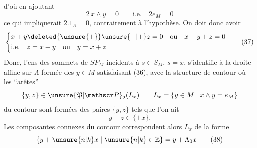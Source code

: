 d'où en ajoutant
\[
2\,x\wedge y=0\qquad\text{i.e.}\quad 2e_M=0
\]
ce qui impliquerait $2.1_\Lambda=0$, contrairement à l'hypothèse. On doit donc avoir
\[
\left\{\begin{aligned}
&x+y\deleted{\unsure{+}}\unsure{-|+}z=0\quad\text{ou}\quad x-y+z=0\\
&\text{i.e.}\quad z=x+y\quad\text{ou}\quad y=x+z
\end{aligned}\right.\tag*{(37)}
\]
Donc, l'ens des sommets de $SP_M$ incidents à $s\in S_M$, $s=\dot x$, s'identifie à la droite affine  sur $\Lambda$ formée des $y\in M$ satisfaisant (36), avec la structure de contour où les ``arêtes''
\[
\{y,z\}\in\unsure{\mathfrak P|\mathscr P}_2(L_x)\qquad L_x=\{y\in M\mid x\wedge y=e_M\}
\]
 du contour sont formées des paires $\{y,z\}$ tels que l'on ait
\[
y-z\in\{\pm x\}.
\]
Les composantes connexes du contour correspondent  alors    $L_x$ de la forme
\[
\{y+\unsure{n|k}x\mid \unsure{n|k}\in\mathbb{Z}\}=y+\Lambda_0 x\tag*{(38)}
\]
